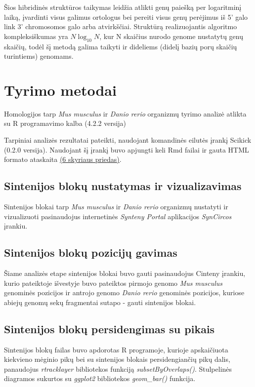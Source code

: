 \documentclass[12pt]{article}
\begin{document}
Šios hibridinės struktūros taikymas leidžia atlikti genų paiešką per logaritminį
laiką, įvardinti visus galimus ortologus bei pereiti visus genų perėjimus iš 5'
galo link 3' chromosomos galo arba atvirkščiai. Struktūrą realizuojantis
algoritmo kompleksiškumas yra $ N\log_{10}N $, kur N skaičius nurodo genome
nustatytų genų skaičių, todėl šį metodą galima taikyti ir dideliems (didelį
bazių porų skaičių turintiems) genomams.

\newpage


\section{Tyrimo metodai}
Homologijos tarp \emph{Mus musculus} ir \emph{Danio rerio} organizmų
tyrimo analizė atlikta su R programavimo kalba\cite{R} (4.2.2 versija)

Tarpiniai analizės rezultatai pateikti, naudojant komandinės eilutės įrankį
Scikick\cite{SCIK} (0.2.0 versija). Naudojant šį įrankį buvo apjungti keli Rmd
failai ir gauta HTML formato ataskaita \hyperref[Priedas]{(6 skyriaus priedas)}.

\subsection{Sintenijos blokų nustatymas ir vizualizavimas}
Sintenijos blokai tarp \emph{Mus musculus} ir \emph{Danio rerio} organizmų
nustatyti ir vizualizuoti pasinaudojus internetinės
\emph{Synteny Portal}\cite{SYN_PORT} aplikacijos \emph{SynCircos} įrankiu.

\subsection{Sintenijos blokų pozicijų gavimas}
Šiame analizės etape sintenijos blokai buvo gauti pasinaudojus Cinteny
įrankiu, kurio pateiktoje išvestyje buvo pateiktos pirmojo genomo
\emph{Mus musculus} genominės pozicijos ir antrojo genomo \emph{Danio rerio}
genominės pozicijos, kuriose abiejų genomų sekų fragmentai sutapo - gauti
sintenijos blokai.

\subsection{Sintenijos blokų persidengimas su pikais}
Sintenijos blokų failas buvo apdorotas R programoje, kurioje apskaičiuota
kiekvieno mėginio pikų bei su sintenijos blokais persidengiančių pikų dalis,
panaudojus \emph{rtracklayer}\cite{R_TRACK} bibliotekos funkciją
\emph{subsetByOverlaps()}. Stulpelinės diagramos sukurtos su
\emph{ggplot2}\cite{R_GGPLOT} bibliotekos \emph{geom\_bar()} funkcija.
\end{document}
